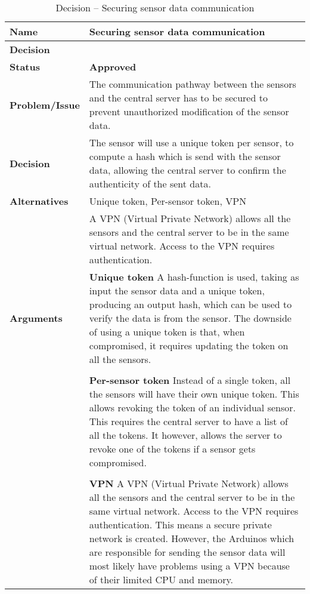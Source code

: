 \begin{table}[H]
	\begin{tabular}{L{0.2\textwidth} L{0.6\textwidth}}
		\textbf{Name}          & \textbf{Securing sensor data communication} \\ \toprule
		\textbf{Decision}      &   \\ \midrule \midrule
		\textbf{Status}        & \textbf{Approved} \\ \midrule
		\textbf{Problem/Issue} & The communication pathway between the sensors and the central server has to be secured to prevent unauthorized modification of the sensor data.                                \\ \midrule
		\textbf{Decision}      & The sensor will use a unique token per sensor, to compute a hash which is send with the sensor data, allowing the central server to confirm the authenticity of the sent data. \\ \midrule
		\textbf{Alternatives}  & Unique token, Per-sensor token, VPN \\
		                       & A VPN (Virtual Private Network) allows all the sensors and the central server to be in the same virtual network. Access to the VPN requires authentication. \\ \midrule
		\textbf{Arguments}     &               
		\textbf{Unique token}
		A hash-function is used, taking as input the sensor data and a unique token, producing an output hash, which can be used to verify the data is from the sensor. The downside of using a unique token is that, when compromised, it requires updating the token on all the sensors. \\\\
		& \textbf{Per-sensor token}
		Instead of a single token, all the sensors will have their own unique token. This allows revoking the token of an individual sensor.
		This requires the central server to have a list of all the tokens. It however, allows the server to revoke one of the tokens if a sensor gets compromised. \\\\
		& \textbf{VPN}
		A VPN (Virtual Private Network) allows all the sensors and the central server to be in the same virtual network. Access to the VPN requires authentication. This means a secure private network is created. However, the Arduinos which are responsible for sending the sensor data will most likely have problems using a VPN because of their limited CPU and memory.
		\\ \bottomrule
	\end{tabular}
	\caption{Decision -- Securing sensor data communication}
	\label{table:sensorcommunication}
\end{table}
